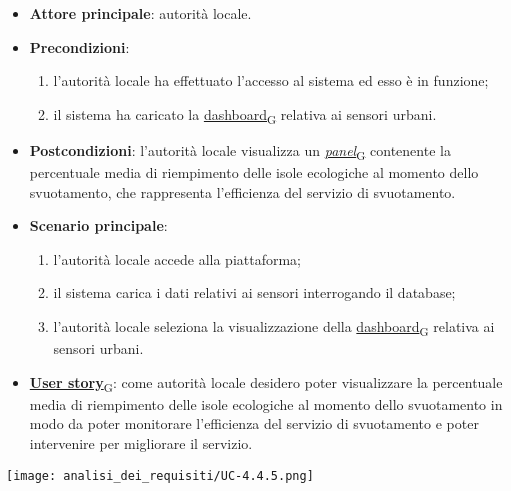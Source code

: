 \begin{itemize}
	\item \textbf{Attore principale}: autorità locale.
	\item \textbf{Precondizioni}:
	      \begin{enumerate}
		      \item l'autorità locale ha effettuato l'accesso al sistema ed esso è in funzione;
		      \item il sistema ha caricato la \href{https://7last.github.io/docs/pb/documentazione-interna/glossario\#dashboard}{dashboard\textsubscript{G}} relativa ai sensori urbani.
	      \end{enumerate}
	\item \textbf{Postcondizioni}: l'autorità locale visualizza un \href{https://7last.github.io/docs/pb/documentazione-interna/glossario\#panel}{\textit{panel}\textsubscript{G}} contenente la percentuale media di riempimento delle isole ecologiche al momento dello svuotamento,
	      che rappresenta l'efficienza del servizio di svuotamento.
	\item \textbf{Scenario principale}:
	      \begin{enumerate}
		      \item l'autorità locale accede alla piattaforma;
		      \item il sistema carica i dati relativi ai sensori interrogando il database;
		      \item l'autorità locale seleziona la visualizzazione della \href{https://7last.github.io/docs/pb/documentazione-interna/glossario\#dashboard}{dashboard\textsubscript{G}} relativa ai sensori urbani.
	      \end{enumerate}
	\item \href{https://7last.github.io/docs/pb/documentazione-interna/glossario\#user-story}{\textbf{User story}\textsubscript{G}}:
	      come autorità locale desidero poter visualizzare la percentuale media di riempimento delle isole ecologiche al momento dello svuotamento in modo da poter monitorare
	      l'efficienza del servizio di svuotamento e poter intervenire per migliorare il servizio.
\end{itemize}
\begin{center}
	\texttt{[image: analisi\_dei\_requisiti/UC-4.4.5.png]}
\end{center}

